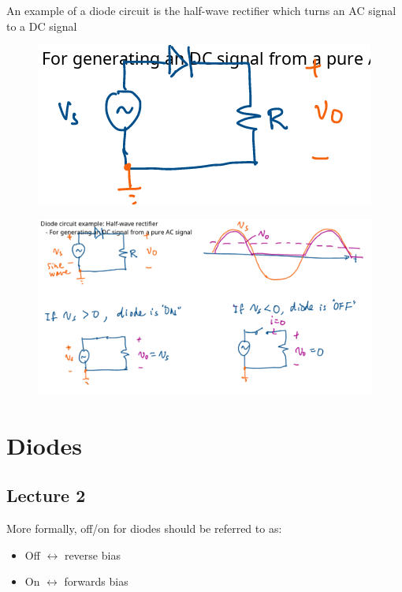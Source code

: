 \documentclass[10pt]{article}
\begin{document}
An example of a diode circuit is the half-wave rectifier which turns an AC signal to a DC signal 

\begin{figure}[H]
	\centering
	\includegraphics[width=0.8\linewidth]{img/image_2022-09-09-12-51-30.png}
\end{figure}

\begin{figure}[H]
	\centering
	\includegraphics[width=0.8\linewidth]{img/image_2022-09-09-13-01-02.png}
\end{figure}

\section{Diodes}

\subsection{Lecture 2}

More formally, off/on for diodes should be referred to as:
\begin{itemize}
	\item Off $ \leftrightarrow $ reverse bias
	\item On $ \leftrightarrow $ forwards bias
\end{itemize}
\end{document}
